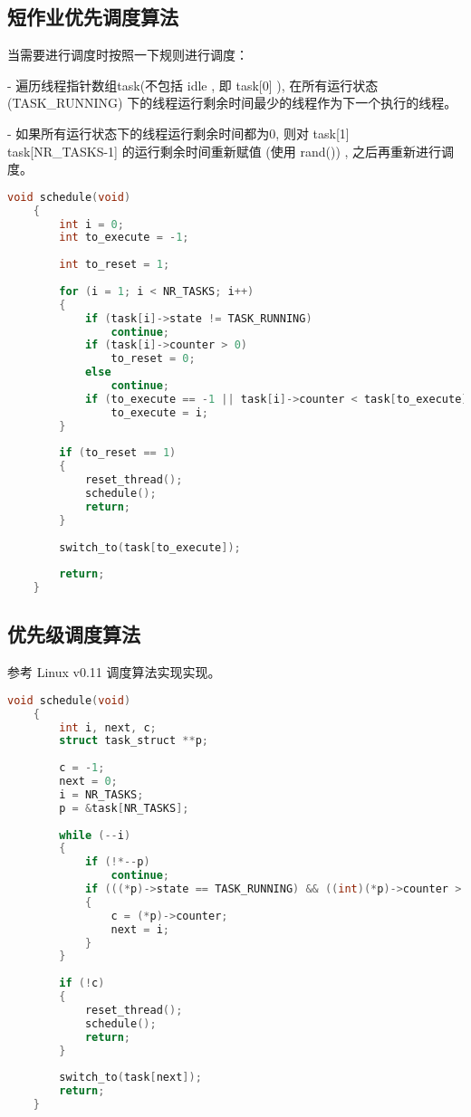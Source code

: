 \documentclass{source/Report}
\begin{document}
\subsection{短作业优先调度算法}

当需要进行调度时按照一下规则进行调度：

- 遍历线程指针数组task(不包括 idle , 即 task[0] ), 在所有运行状态 (TASK\_RUNNING) 下的线程运行剩余时间最少的线程作为下一个执行的线程。

- 如果所有运行状态下的线程运行剩余时间都为0, 则对 task[1] ~ task[NR\_TASKS-1] 的运行剩余时间重新赋值 (使用 rand()) , 之后再重新进行调度。

\begin{lstlisting}[language = c, title = {短作业}]
    void schedule(void)
    {
        int i = 0;
        int to_execute = -1;
    
        int to_reset = 1;
    
        for (i = 1; i < NR_TASKS; i++)
        {
            if (task[i]->state != TASK_RUNNING)
                continue;
            if (task[i]->counter > 0)
                to_reset = 0;
            else
                continue;
            if (to_execute == -1 || task[i]->counter < task[to_execute]->counter)
                to_execute = i;
        }
    
        if (to_reset == 1)
        {
            reset_thread();
            schedule();
            return;
        }
    
        switch_to(task[to_execute]);
    
        return;
    }
\end{lstlisting}

\subsection{优先级调度算法}

参考 Linux v0.11 调度算法实现实现。   

\begin{lstlisting}[language = c, title = {优先级}]
    void schedule(void)
    {
        int i, next, c;
        struct task_struct **p;
    
        c = -1;
        next = 0;
        i = NR_TASKS;
        p = &task[NR_TASKS];
    
        while (--i)
        {
            if (!*--p)
                continue;
            if (((*p)->state == TASK_RUNNING) && ((int)(*p)->counter > c))
            {
                c = (*p)->counter;
                next = i;
            }
        }
    
        if (!c)
        {
            reset_thread();
            schedule();
            return;
        }
    
        switch_to(task[next]);
        return;
    }
\end{lstlisting}
\end{document}
